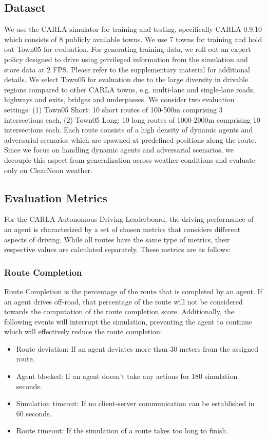 \documentclass[letterpaper, 12pt]{article}
\theoremstyle{definition}
\theoremstyle{definition}
\theoremstyle{definition}
\theoremstyle{definition}
\theoremstyle{definition}
\begin{document}
\subsection{Dataset}
\label{sec:orgbe0c961}
We use the CARLA \cite{Dosovitskiy2017} simulator for training and testing,
specifically CARLA 0.9.10 which consists of 8 publicly available towns. We use 7
towns for training and hold out Town05 for evaluation. For generating training
data, we roll out an expert policy designed to drive using privileged
information from the simulation and store data at 2 FPS. Please refer to the
supplementary material for additional details. We select Town05 for evaluation
due to the large diversity in drivable regions compared to other CARLA towns,
e.g. multi-lane and single-lane roads, highways and exits, bridges and
underpasses. We consider two evaluation settings: (1) Town05 Short: 10 short
routes of 100-500m comprising 3 intersections each, (2) Town05 Long: 10 long
routes of 1000-2000m comprising 10 intersections each. Each route consists of
a high density of dynamic agents and adversarial scenarios which are spawned
at predefined positions along the route. Since we focus on handling dynamic
agents and adversarial scenarios, we decouple this aspect from generalization
across weather conditions and evaluate only on ClearNoon weather.
\subsection{Evaluation Metrics \label{org69f38ec}}
\label{sec:org9187805}
For the CARLA Autonomous Driving Leaderboard, the driving performance of an
agent is characterized by a set of chosen metrics that considers different
aspects of driving. While all routes have the same type of metrics, their
respective values are calculated separately. These metrics are as follows:

\subsubsection{Route Completion}
\label{sec:orgef08b4c}
Route Completion is the percentage of the route that is completed by an
agent. If an agent drives off-road, that percentage of the route will not be
considered towards the computation of the route completion score. Additionally,
the following events will interrupt the simulation, preventing the agent to
continue which will effectively reduce the route completion:

\begin{itemize}
\item Route deviation: If an agent deviates more than 30 meters from the assigned route.
\item Agent blocked: If an agent doesn’t take any actions for 180 simulation seconds.
\item Simulation timeout: If no client-server communication can be established in 60 seconds.
\item Route timeout: If the simulation of a route takes too long to finish.
\end{itemize}
\end{document}
